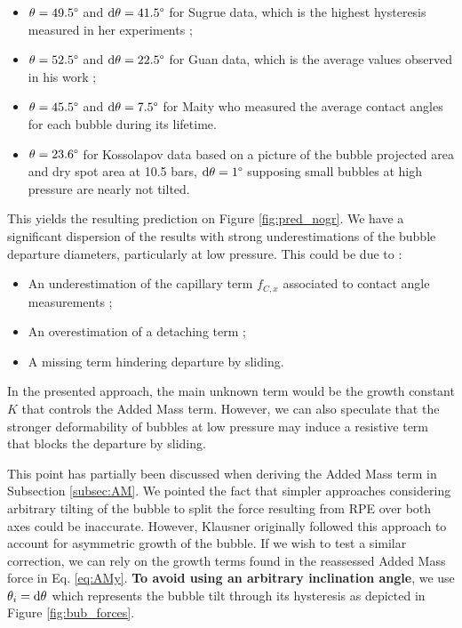 \begin{itemize}
\item $\theta=49.5\degree$ and $\mathrm{d}\theta = 41.5\degree$ for Sugrue data, which is the highest hysteresis measured in her experiments ;
\item $\theta = 52.5\degree$ and $\mathrm{d}\theta = 22.5\degree$ for Guan data, which is the average values observed in his work ;
\item $\theta = 45.5\degree$ and $\mathrm{d}\theta = 7.5\degree$ for Maity who measured the average contact angles for each bubble during its lifetime. 
\item $\theta = 23.6 \degree$ for Kossolapov data based on a picture of the bubble projected area and dry spot area at 10.5 bars, $\mathrm{d}\theta = 1\degree$ supposing small bubbles at high pressure are nearly not tilted.
\end{itemize}

This yields the resulting prediction on Figure \ref{fig:pred_nogr}. We have a significant dispersion of the results with strong underestimations of the bubble departure diameters, particularly at low pressure. This could be due to :

\begin{itemize}
\item An underestimation of the capillary term $f_{C,x}$ associated to contact angle measurements ;
\item An overestimation of a detaching term ;
\item A missing term hindering departure by sliding.
\end{itemize}

In the presented approach, the main unknown term would be the growth constant $K$ that controls the Added Mass term. However, we can also speculate that the stronger deformability of bubbles at low pressure may induce a resistive term that blocks the departure by sliding. 

This point has partially been discussed when deriving the Added Mass term in Subsection \ref{subsec:AM}. We pointed the fact that simpler approaches considering arbitrary tilting of the bubble to split the force resulting from RPE over both axes could be inaccurate. However, Klausner originally followed this approach to account for asymmetric growth of the bubble. If we wish to test a similar correction, we can rely on the growth terms found in the reassessed Added Mass force in Eq. \ref{eq:AMy}. \textbf{To avoid using an arbitrary inclination angle}, we use $\theta_{i}=\mathrm{d}\theta$ which represents the bubble tilt through its hysteresis as depicted in Figure \ref{fig:bub_forces}.

